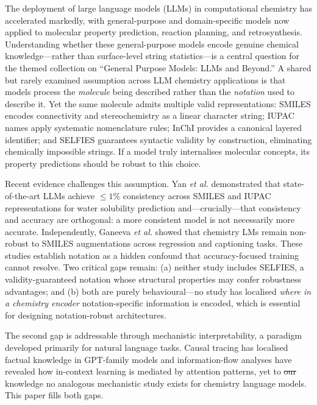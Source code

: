 \documentclass[twoside,twocolumn,9pt]{article}
\makeatletter
\providecommand{\DIFaddtex}[1]{{\protect\color{blue}\uwave{#1}}} %
\providecommand{\DIFdeltex}[1]{{\protect\color{red}\sout{#1}}} %
\providecommand{\DIFaddbegin}{} %
\providecommand{\DIFaddend}{} %
\providecommand{\DIFdelbegin}{} %
\providecommand{\DIFdelend}{} %
\providecommand{\DIFadd}[1]{\texorpdfstring{\DIFaddtex{#1}}{#1}} %
\providecommand{\DIFdel}[1]{\texorpdfstring{\DIFdeltex{#1}}{}} %
\providecommand{\DIFscaledelfig}{0.5}
\newlength{\DIFdelgraphicswidth} %
\newlength{\DIFdelgraphicsheight} %
\providecommand{\DIFaddincludegraphics}[2][]{{\color{blue}\fbox{\DIFOincludegraphics[#1]{#2}}}} %
\providecommand{\DIFdelincludegraphics}[2][]{%
\sbox{\DIFdelgraphicsbox}{\DIFOincludegraphics[#1]{#2}}%
\settoboxwidth{\DIFdelgraphicswidth}{\DIFdelgraphicsbox} %
\settoboxtotalheight{\DIFdelgraphicsheight}{\DIFdelgraphicsbox} %
\scalebox{\DIFscaledelfig}{%
\parbox[b]{\DIFdelgraphicswidth}{\usebox{\DIFdelgraphicsbox}\\[-\baselineskip] \rule{\DIFdelgraphicswidth}{0em}}\llap{\resizebox{\DIFdelgraphicswidth}{\DIFdelgraphicsheight}{%
\setlength{\unitlength}{\DIFdelgraphicswidth}%
\begin{picture}(1,1)%
\thicklines\linethickness{2pt} %
{\color[rgb]{1,0,0}\put(0,0){\framebox(1,1){}}}%
{\color[rgb]{1,0,0}\put(0,0){\line( 1,1){1}}}%
{\color[rgb]{1,0,0}\put(0,1){\line(1,-1){1}}}%
\end{picture}%
}\hspace*{3pt}}} %
} %
\DeclareRobustCommand{\DIFaddbegin}{\DIFOaddbegin \let\includegraphics\DIFaddincludegraphics} %
\DeclareRobustCommand{\DIFaddend}{\DIFOaddend \let\includegraphics\DIFOincludegraphics} %
\DeclareRobustCommand{\DIFdelbegin}{\DIFOdelbegin \let\includegraphics\DIFdelincludegraphics} %
\DeclareRobustCommand{\DIFdelend}{\DIFOaddend \let\includegraphics\DIFOincludegraphics} %
\let\sout@orig\sout %
\renewcommand{\sout}[1]{\ifmmode\text{\sout@orig{\ensuremath{#1}}}\else\sout@orig{#1}\fi} %
\makeatother
\begin{document}
The deployment of large language models (LLMs) in computational chemistry has accelerated markedly, with general-purpose and domain-specific models now applied to molecular property prediction, reaction planning, and retrosynthesis.\cite{bran2024,white2023,jablonka2024,jablonka2024predictive} Understanding whether these general-purpose models encode genuine chemical knowledge---rather than surface-level string statistics---is a central question for the themed collection on ``General Purpose Models: LLMs and Beyond.'' A shared but rarely examined assumption across LLM chemistry applications is that models process the \textit{molecule} being described rather than the \textit{notation} used to describe it. Yet the same molecule admits multiple valid representations: SMILES\cite{weininger1988} encodes connectivity and stereochemistry as a linear character string; IUPAC names apply systematic nomenclature rules; InChI\cite{heller2015} provides a canonical layered identifier; and SELFIES\cite{krenn2020} guarantees syntactic validity by construction, eliminating chemically impossible strings. If a model truly internalises molecular concepts, its property predictions should be robust to this choice.

Recent evidence challenges this assumption. Yan \textit{et al.}\cite{yan2025} demonstrated that state-of-the-art LLMs achieve $\leq1\%$ consistency across SMILES and IUPAC representations for water solubility prediction and---crucially---that consistency and accuracy are orthogonal: a more consistent model is not necessarily more accurate. Independently, Ganeeva \textit{et al.}\cite{ganeeva2025} showed that chemistry LMs remain non-robust to SMILES augmentations across regression and captioning tasks. These studies establish notation as a hidden confound that accuracy-focused training cannot resolve. Two critical gaps remain: (a) neither study includes SELFIES, a validity-guaranteed notation whose structural properties may confer robustness advantages; and (b) both are purely behavioural---no study has localised \textit{where in a chemistry encoder} notation-specific information is encoded, which is essential for designing notation-robust architectures.

The second gap is addressable through mechanistic interpretability, a paradigm developed primarily for natural language tasks. Causal tracing has localised factual knowledge in GPT-family models\cite{meng2022} and information-flow analyses have revealed how in-context learning is mediated by attention patterns,\cite{wang2023} yet to \DIFdelbegin \DIFdel{our }\DIFdelend \DIFaddbegin \DIFadd{my }\DIFaddend knowledge no analogous mechanistic study exists for chemistry language models. This paper fills both gaps.
\end{document}
